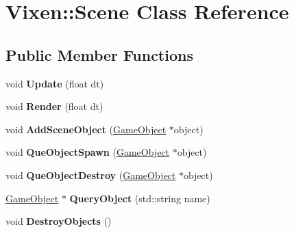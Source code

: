 \hypertarget{class_vixen_1_1_scene}{}\section{Vixen\+:\+:Scene Class Reference}
\label{class_vixen_1_1_scene}
\subsection*{Public Member Functions}
\begin{DoxyCompactItemize}
\item 
\hypertarget{class_vixen_1_1_scene_a02bdf424b1c81476f7ad788ea88b8eb9}{}void {\bfseries Update} (float dt)\label{class_vixen_1_1_scene_a02bdf424b1c81476f7ad788ea88b8eb9}

\item 
\hypertarget{class_vixen_1_1_scene_ac96d11a2477bc647d0d582833478b0ea}{}void {\bfseries Render} (float dt)\label{class_vixen_1_1_scene_ac96d11a2477bc647d0d582833478b0ea}

\item 
\hypertarget{class_vixen_1_1_scene_a5659c67b35aef9c80f5ac4e22823091f}{}void {\bfseries Add\+Scene\+Object} (\hyperlink{class_vixen_1_1_game_object}{Game\+Object} $\ast$object)\label{class_vixen_1_1_scene_a5659c67b35aef9c80f5ac4e22823091f}

\item 
\hypertarget{class_vixen_1_1_scene_aefafdcc845386916f84e0d3dd35e1e3a}{}void {\bfseries Que\+Object\+Spawn} (\hyperlink{class_vixen_1_1_game_object}{Game\+Object} $\ast$object)\label{class_vixen_1_1_scene_aefafdcc845386916f84e0d3dd35e1e3a}

\item 
\hypertarget{class_vixen_1_1_scene_a05a386ff8c6af7cb8c8c3f49b1ba89ce}{}void {\bfseries Que\+Object\+Destroy} (\hyperlink{class_vixen_1_1_game_object}{Game\+Object} $\ast$object)\label{class_vixen_1_1_scene_a05a386ff8c6af7cb8c8c3f49b1ba89ce}

\item 
\hypertarget{class_vixen_1_1_scene_a5e5152244b2771bcc36cf2cfebf21f4e}{}\hyperlink{class_vixen_1_1_game_object}{Game\+Object} $\ast$ {\bfseries Query\+Object} (std\+::string name)\label{class_vixen_1_1_scene_a5e5152244b2771bcc36cf2cfebf21f4e}

\item 
\hypertarget{class_vixen_1_1_scene_a6baac4431e44fca8ccc6a6b8f099909e}{}void {\bfseries Destroy\+Objects} ()\label{class_vixen_1_1_scene_a6baac4431e44fca8ccc6a6b8f099909e}


\end{DoxyCompactItemize}
